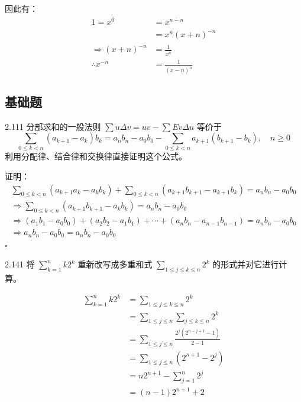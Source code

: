因此有：
\begin{align*}
  1 = x^{\overline{0}} &= x^{\overline{n - n}} \\
  &= x^{\overline{n}} (x + n)^{\overline{-n}} \\
  \Rightarrow (x + n)^{\overline{-n}} &= \frac{1}{x^{\overline{n}}} \\
  \therefore x^{\overline{-n}} &= \frac{1}{(x - n)^{\overline{n}}}
\end{align*}

\subsection{基础题}

\begin{problem}{2.11}{1}
  分部求和的一般法则 \( \sum u \Delta v = uv - \sum Ev \Delta u \) 等价于
  \[
    \sum_{0 \leq k < n} (a_{k+1} - a_k) b_k = a_n b_n - a_0 b_0 - \sum_{0 \leq k < n} a_{k+1} (b_{k+1} - b_k), \quad n \geq 0
  \]
  利用分配律、结合律和交换律直接证明这个公式。
\end{problem}

证明：
\begin{gather*}
  \sum_{0 \leq k < n} (a_{k+1} a_k - a_k b_k) + \sum_{0 \leq k < n} (a_{k+1} b_{k+1} - a_{k+1} b_k) = a_n b_n - a_0 b_0 \\
  \Rightarrow \sum_{0 \leq k < n} (a_{k+1} b_{k+1} - a_k b_k) = a_n b_n - a_0 b_0 \\
  \Rightarrow (a_1 b_1 - a_0 b_0) + (a_2 b_2 - a_1 b_1) + \cdots + (a_n b_n - a_{n-1} b_{n-1}) = a_n b_n - a_0 b_0 \\
  \Rightarrow a_n b_n - a_0 b_0 = a_n b_n - a_0 b_0
\end{gather*}
\hfill \( \square \)

\begin{problem}{2.14}{1}
  将 \( \sum_{k=1}^n k 2^k \) 重新改写成多重和式 \( \sum_{1 \leq j \leq k \leq n} 2^k \) 的形式并对它进行计算。
\end{problem}

\begin{align*}
  \sum_{k=1}^n k 2^k &= \sum_{1 \leq j \leq k \leq n} 2^k \\
  &= \sum_{1 \leq j \leq n} \sum_{j \leq k \leq n} 2^k \\
  &= \sum_{1 \leq j \leq n} \frac{2^j (2^{n-j+1} - 1)}{2 - 1} \\
  &= \sum_{1 \leq j \leq n} (2^{n+1} - 2^j) \\
  &= n 2^{n+1} - \sum_{j=1}^n 2^j \\
  &= (n - 1) 2^{n+1} + 2
\end{align*}

